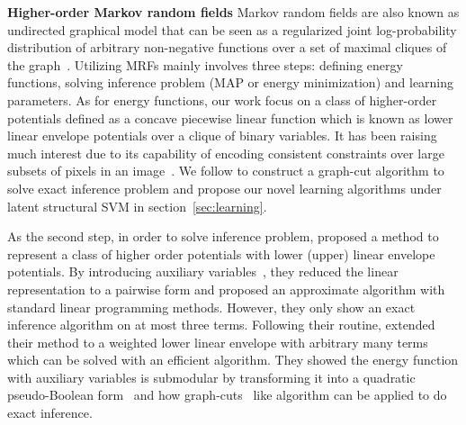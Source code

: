 \documentclass[sigconf]{acmart}
\renewcommand{\citename}{\citet}
\renewcommand{\cite}{\citep}
\begin{document}


\textbf{Higher-order Markov random fields} Markov random
  fields are also known as undirected graphical model
that can be seen as a regularized joint log-probability
distribution of arbitrary non-negative functions over a set of
maximal cliques of the graph~\cite{bishop:2006:PRML}. Utilizing
MRFs mainly involves three steps: defining energy
  functions, solving inference problem (MAP or energy
minimization) and learning parameters. As for energy
  functions, our work focus on a class of higher-order
potentials defined as a concave piecewise linear function which
is known as lower linear envelope potentials over a clique
of binary variables. It has been raising much interest due to its
capability of encoding consistent constraints over large subsets
of pixels in an image~\cite{Kohli:CVPR07,Nowozin:2011}. We follow
\citename{gouldlearning} to construct a graph-cut algorithm to
solve exact inference problem and propose our novel learning
algorithms under latent structural SVM in
section~\ref{sec:learning}.

As the second step, in order to solve inference problem,
\citename{kohli2009robust} proposed a method to represent a class
of higher order potentials with lower (upper) linear envelope
potentials. By introducing auxiliary
variables~\cite{Kohli:CVPR10}, they reduced the linear
representation to a pairwise form and proposed an approximate
algorithm with standard linear programming methods. However, they
only show an exact inference algorithm on at most three terms.
Following their routine, \citename{gouldlearning} extended their
method to a weighted lower linear envelope with arbitrary many
terms which can be solved with an efficient algorithm. They
showed the energy function with auxiliary variables is submodular
by transforming it into a quadratic pseudo-Boolean
form~\cite{Boros:MATH02} and how
graph-cuts~\cite{Hammer:1965, Boykov:ICCV01,
  Freedman:CVPR05} like algorithm can be applied to do exact
inference.
\end{document}

